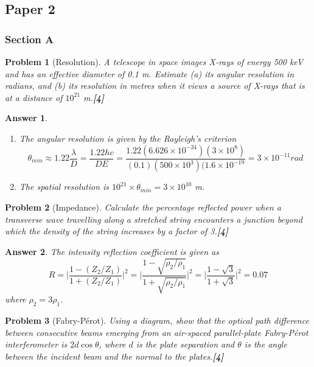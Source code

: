 \documentclass[a4paper]{article}
\newtheorem{ans}{Answer}[subsection]
\theoremstyle{new}
\newtheorem{qns}{Problem}[subsection]
\begin{document}
\subsection{Paper 2}
\subsubsection{Section A}
\begin{qns}[Resolution]
A telescope in space images X-rays of energy 500 keV and has an effective diameter of 0.1 m. Estimate (a) its angular resolution in radians, and (b) its resolution in metres when it views a source of X-rays that is at a distance of $10^{21}$ m.\hfill\textbf{[4]}
\end{qns}
\begin{ans}\leavevmode
\begin{enumerate}[label=(\alph*)]
\item The angular resolution is given by the Rayleigh's criterion
$$\theta_{min}\approx 1.22\frac{\lambda}{D}=\frac{1.22hc}{DE}=\frac{1.22(6.626\times10^{-34})(3\times10^8)}{(0.1)(500\times10^3)(1.6\times10^{-19}}=3\times10^{-11}rad$$
\item The spatial resolution is $10^{21}\times\theta_{min}=3\times10^{10}$ m.
\end{enumerate}
\end{ans}
\begin{qns}[Impedance]
Calculate the percentage reflected power when a transverse wave travelling along a stretched string encounters a junction beyond which the density of the string increases by a factor of 3.\hfill\textbf{[4]}
\end{qns}
\begin{ans}
The intensity reflection coefficient is given as
$$R=\bigg|\frac{1-(Z_2/Z_1)}{1+(Z_2/Z_1)}\bigg|^2=\bigg|\frac{1-\sqrt{\rho_2/\rho_1}}{1+\sqrt{\rho_2/\rho_1}}\bigg|^2=\bigg|\frac{1-\sqrt{3}}{1+\sqrt{3}}\bigg|^2=0.07$$
where $\rho_2=3\rho_1$.
\end{ans}
\begin{qns}[Fabry-Pérot]
Using a diagram, show that the optical path difference between consecutive beams emerging from an air-spaced parallel-plate Fabry-Pérot interferometer is $2d\cos\theta$, where $d$ is the plate separation and $\theta$ is the angle between the incident beam and the normal to the plates.\hfill\textbf{[4]}
\end{qns}
\end{document}
